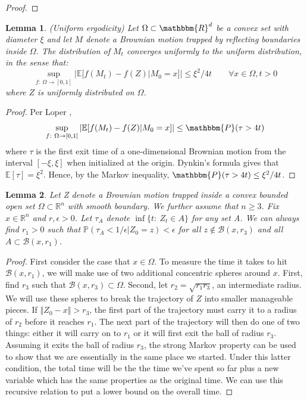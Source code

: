 \documentclass[12pt, nofootinbib,english, amsmath, amssymb, aps, priprint, graphicx,floatfix]{revtex4-1}
\newtheorem{lemma}{Lemma}
\theoremstyle{plain}
\theoremstyle{definition}
\theoremstyle{plain}
\newcommand{\bb}[1]{\mathcal{B}\left(#1\right)}
\begin{document}
{\begin{proof}
\end{proof}


\begin{lemma}
\label{lem:uniform_ergodicity}(Uniform ergodicity) Let $\Omega\subset\mathbbm{R}^d$ be a convex set with diameter $\xi$ and let $M$ denote a Brownian motion trapped by reflecting boundaries inside $\Omega$.  The distribution of $M_t$ converges uniformly to the uniform distribution, in the sense that:
%
\[
\sup_{f:\ \Omega\rightarrow [0,1]} | \mathbb{E}[f(M_t) - f(Z)|M_0=x]| \leq \xi^2/4t \qquad \forall x\in \Omega, t>0
\]
%
where $Z$ is uniformly distributed on $\Omega$.
\end{lemma}
\begin{proof}
Per Loper \cite{Loper2018},
\[
\sup_{f:\ \Omega\rightarrow [0,1]} | \mathbb{E}[f(M_t) - f(Z)|M_0=x]| \leq \mathbbm{P}(\tau>4t)
\]
where $\tau$ is the first exit time of a one-dimensional Brownian motion from the interval $[-\xi,\xi]$ when initialized at the origin. Dynkin's formula gives that $\mathbb{E}[\tau]=\xi^2$. Hence, by the Markov inequality, $\mathbbm{P}(\tau>4t)\leq \xi^2/4t$.
\end{proof}


\begin{lemma}
\label{lem:longtime_diamater}
Let Z denote a Brownian motion trapped inside a convex bounded open set $\Omega\subset\mathbb{R}^{n}$ with smooth boundary.  We further assume that $n\geq3$. Fix $x\in\mathbb{R}^{n}$ and $r,\epsilon>0$. Let $\tau_{A}$ denote $\inf\{t:\ Z_{t}\in A\}$ for any set A. We can always find $r_1>0$ such that $\mathbb{P}(\tau_{A}<1/\epsilon|Z_{0}=z)<\epsilon$ for all $z\notin\bb{x,r_3}$ and all $A\subset\bb{x,r_1}$.
\end{lemma}
\begin{proof}
First consider the case that $x \in \Omega$.  To measure the time it takes to hit $\bb{x,r_1}$, we will make use of two additional concentric spheres around $x$.  First, find $r_3$ such that $\bb{x,r_3} \subset \Omega$.  Second, let $r_2 =\sqrt{r_1 r_3}$, an intermediate radius.    We will use these spheres to break the trajectory of $Z$ into smaller manageable pieces. If $\left\Vert Z_{0}-x\right\Vert >r_3$,
the first part of the trajectory must carry it to a radius of $r_2$ before it reaches $r_1$.
The next part of the trajectory will then do one of two things: either
it will carry on to $r_1$ or it will first exit the ball of radius
$r_3$. Assuming it exits the ball of radius $r_3$, the strong Markov
property can be used to show that we are essentially in the same place
we started. Under this latter condition, the total time will be the
the time we've spent so far plus a new variable which has the same
properties as the original time. We can use this recursive relation to put a lower
bound on the overall time.


\end{proof}}
\end{document}
